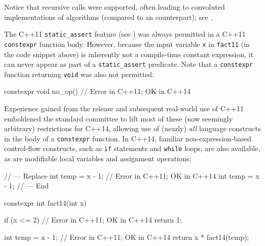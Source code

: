 \noindent Notice that recursive calls were supported, often leading to convoluted
implementations of algorithms (compared to an 
counterpart); see . 

The C++11 \lstinline!static_assert! feature (see ) was always
permitted in a C++11 \lstinline!constexpr! function body.
However, because the input variable \lstinline!x! in \lstinline!fact11!
(in the code snippet above) is inherently not a compile-time constant expression, it can
never appear as part of a \lstinline!static_assert! predicate. Note that a
\lstinline!constexpr! function returning \lstinline!void! was also not permitted:

\begin{emcppslisting}[emcppsstandards={c++14}]
constexpr void no_op() { }  // Error in C++11; OK in C++14
\end{emcppslisting}
    
\noindent Experience gained from the release and subsequent real-world use of
C++11 emboldened the standard committee to lift most of these (now
seemingly arbitrary) restrictions for C++14, allowing use of (nearly)
\emph{all} language constructs in the body of a \lstinline!constexpr!
function. In C++14, familiar non-expression-based control-flow
constructs, such as \lstinline!if! statements and \lstinline!while! loops, are
also available, as are modifiable local variables and assignment
operations:

\begin{emcppshiddenlisting}[emcppsbatch=e1]
// --- Replace
    int temp = x - 1;  // Error in C++11; OK in C++14
    int temp = x - 1;
// --- End
\end{emcppshiddenlisting}
\begin{emcppslisting}[emcppsstandards={c++14},emcppsbatch=e1]
constexpr int fact14(int x)
{
    if (x <= 2)        // Error in C++11; OK in C++14
    {
        return 1;
    }

    int temp = x - 1;  // Error in C++11; OK in C++14
    return x * fact14(temp);
}
\end{emcppslisting}
    
